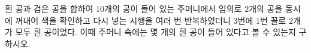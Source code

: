 흰 공과 검은 공을 합하여 $10$개의 공이 들어 있는 주머니에서 임의로 $2$개의 공을 동시에 꺼내어 색을 확인하고 다시 넣는 시행을 여러 번 반복하였더니 $3$번에 $1$번 꼴로 $2$개가 모두 흰 공이었다. 이때 주머니 속에는 몇 개의 흰 공이 들어 있다고 볼 수 있는지 구하시오.

